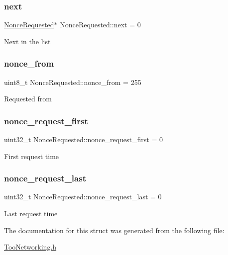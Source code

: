 \subsubsection{\texorpdfstring{next}{next}}
{\footnotesize\ttfamily \hyperlink{structNonceRequested}{Nonce\+Requested}$\ast$ Nonce\+Requested\+::next = 0}

Next in the list \mbox{\label{structNonceRequested_a49d5f4e83fa72e51cc37237cc46f3a7e}} 
\subsubsection{\texorpdfstring{nonce\+\_\+from}{nonce\_from}}
{\footnotesize\ttfamily uint8\+\_\+t Nonce\+Requested\+::nonce\+\_\+from = 255}

Requested from \mbox{\label{structNonceRequested_a9e2f47eec20e01c7cce1acf2d47bbf14}} 
\subsubsection{\texorpdfstring{nonce\+\_\+request\+\_\+first}{nonce\_request\_first}}
{\footnotesize\ttfamily uint32\+\_\+t Nonce\+Requested\+::nonce\+\_\+request\+\_\+first = 0}

First request time \mbox{\label{structNonceRequested_ae5453d115c1ba4044592921e0127f0c8}} 
\subsubsection{\texorpdfstring{nonce\+\_\+request\+\_\+last}{nonce\_request\_last}}
{\footnotesize\ttfamily uint32\+\_\+t Nonce\+Requested\+::nonce\+\_\+request\+\_\+last = 0}

Last request time 

The documentation for this struct was generated from the following file\+:\begin{DoxyCompactItemize}
\item 
\hyperlink{TooNetworking_8h}{Too\+Networking.\+h}\end{DoxyCompactItemize}
